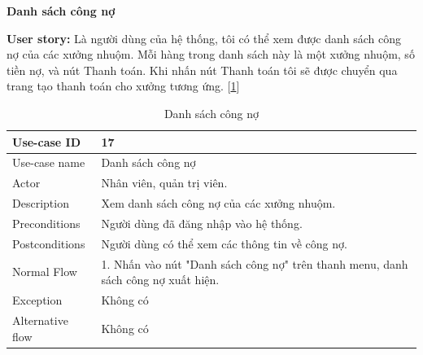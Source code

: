 \textbf{Danh sách công nợ}\par
\textbf{User story:} Là người dùng của hệ thống, tôi có thể xem được danh sách công nợ của các xưởng nhuộm. Mỗi hàng trong danh sách này là một xưởng nhuộm, số tiền nợ, và nút Thanh toán. Khi nhấn nút Thanh toán tôi sẽ được chuyển qua trang tạo thanh toán cho xưởng tương ứng. [\ref{bang17}]
\begin{table}[!htp]
    \centering
    \begin{tabular}{|m{3cm}|m{10cm}|}
    \hline 
        Use-case ID & 17\\ \hline
        Use-case name & Danh sách công nợ\\ \hline
        Actor & Nhân viên, quản trị viên.\\ \hline
        Description & Xem danh sách công nợ của các xưởng nhuộm.\\ \hline
        Preconditions & Người dùng đã đăng nhập vào hệ thống.\\ \hline
        Postconditions & Người dùng có thể xem các thông tin về công nợ.\\ \hline
        Normal Flow & 
        1. Nhấn vào nút "Danh sách công nợ" trên thanh menu, danh sách công nợ xuất hiện.
        \\ \hline
        Exception & Không có\\ \hline
        Alternative flow & Không có\\ 
    \hline 
    \end{tabular}
    \caption{Danh sách công nợ}
    \label{bang17}
\end{table}

